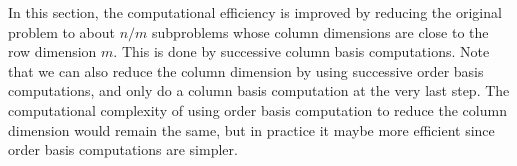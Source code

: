\begin{rem}
In this section, the computational efficiency is improved by reducing
the original problem to about $n/m$ subproblems whose column dimensions
are close to the row dimension $m$. This is done by successive column
basis computations. Note that we can also reduce the column dimension
by using successive order basis computations, and only do a column
basis computation at the very last step. The computational complexity
of using order basis computation to reduce the column dimension would
remain the same, but in practice it maybe more efficient since order
basis computations are simpler.\end{rem}

